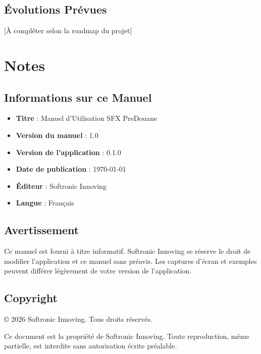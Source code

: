 \documentclass[12pt,a4paper]{report}
\begin{document}
\section{Évolutions Prévues}

[À compléter selon la roadmap du projet]


\chapter*{Notes}

\vspace{2cm}

\section*{Informations sur ce Manuel}

\begin{itemize}[leftmargin=*]
    \item \textbf{Titre} : Manuel d'Utilisation SFX PreDouane
    \item \textbf{Version du manuel} : 1.0
    \item \textbf{Version de l'application} : 0.1.0
    \item \textbf{Date de publication} : \today
    \item \textbf{Éditeur} : Softronic Innoving
    \item \textbf{Langue} : Français
\end{itemize}

\section*{Avertissement}

Ce manuel est fourni à titre informatif. Softronic Innoving se réserve le droit de modifier l'application et ce manuel sans préavis. Les captures d'écran et exemples peuvent différer légèrement de votre version de l'application.

\section*{Copyright}

© 2026 Softronic Innoving. Tous droits réservés.

Ce document est la propriété de Softronic Innoving. Toute reproduction, même partielle, est interdite sans autorisation écrite préalable.
\end{document}
